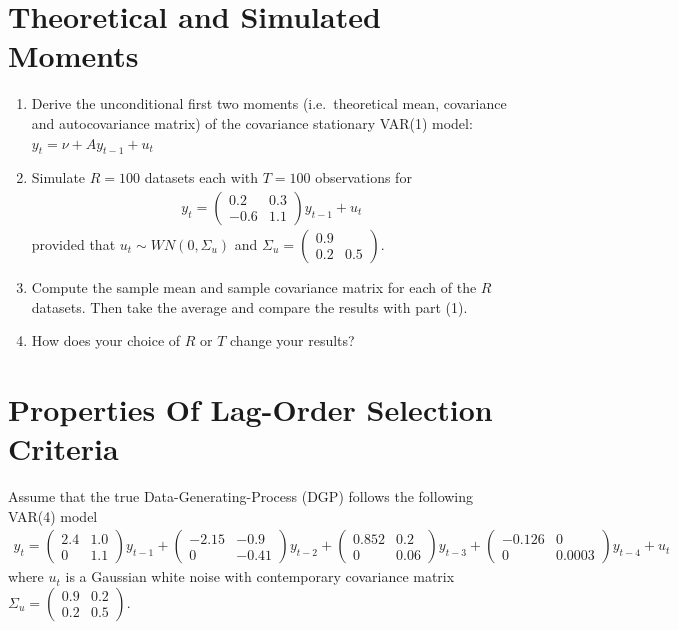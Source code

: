 \documentclass{article}
\begin{document}
\section[Theoretical and Simulated Moments]{Theoretical and Simulated Moments\label{ex:TheoreticalAndSimulatedMoments}}
\begin{enumerate}
 	\item Derive the unconditional first two moments (i.e.\ theoretical mean, covariance and autocovariance matrix) of the covariance stationary VAR(1) model: \(y_t = \nu + A y_{t-1} + u_t\)
 	\item Simulate \(R=100\) datasets each with \(T=100\) observations for
 	\begin{align*}
 	y_t = \begin{pmatrix}0.2 &0.3 \\-0.6 & 1.1 \end{pmatrix} y_{t-1}  + u_t
 	\end{align*}
 	provided that \(u_t \sim WN(0,\Sigma_u)\) and \(\Sigma_u = \begin{pmatrix}0.9 &  \\ 0.2 & 0.5 \end{pmatrix}\).
	\item Compute the sample mean and sample covariance matrix for each of the \(R\) datasets. 
	Then take the average and compare the results with part (1).
	\item How does your choice of \(R\) or \(T\) change your results?
	
\end{enumerate}

\newpage


\section{Properties Of Lag-Order Selection Criteria}
Assume that the true Data-Generating-Process (DGP) follows the following VAR(4) model
\begin{align*}
y_t = \begin{pmatrix}
2.4 & 1.0\\
0 & 1.1
\end{pmatrix}
y_{t-1}+
\begin{pmatrix}
-2.15 & -0.9\\
0 & -0.41
\end{pmatrix}
y_{t-2}+
\begin{pmatrix}
0.852 & 0.2\\
0& 0.06
\end{pmatrix}
y_{t-3}+
\begin{pmatrix}
-0.126 & 0\\
0 & 0.0003
\end{pmatrix}
y_{t-4}
+ u_t
\end{align*}
where \(u_t\) is a Gaussian white noise with contemporary covariance matrix \(\Sigma_u = \begin{pmatrix}
0.9&0.2\\0.2&0.5
\end{pmatrix}\).
\end{document}
